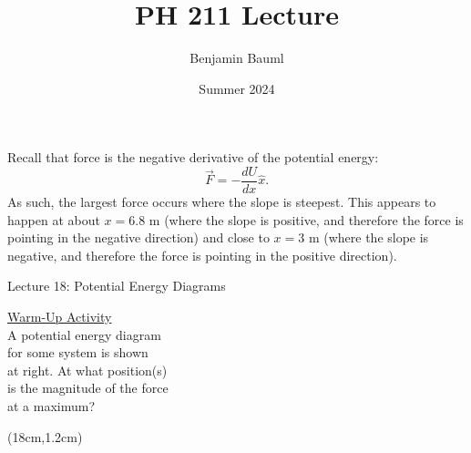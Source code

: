 \documentclass[]{article}
\title{PH 211 Lecture \Week}
\author{Benjamin Bauml}
\date{Summer 2024}
\newcommand{\Week}{18}
\begin{document}
\begin{TeacherMargin}
\noindent Recall that force is the negative derivative of the potential energy:
\[
\vec{F} = -\frac{dU}{dx}\hat{x}.
\]
As such, the largest force occurs where the slope is steepest. This appears to happen at about $x=6.8$ m (where the slope is positive, and therefore the force is pointing in the negative direction) and close to $x=3$ m (where the slope is negative, and therefore the force is pointing in the positive direction).
\end{TeacherMargin}
\begin{PresentSpace}
\begin{center}
	\huge Lecture \Week: Potential Energy Diagrams
\end{center}
\vspace{0.5cm}
\underline{Warm-Up Activity} \\
A potential energy diagram \\
for some system is shown \\
at right. At what position(s) \\
is the magnitude of the force \\
at a maximum?
\end{PresentSpace}
\begin{textblock*}{8cm}(18cm,1.2cm)
\begin{center}
	\Large
\end{center}
\end{textblock*}
\newpage
\begin{TeacherMargin}

\end{TeacherMargin}
\end{document}
